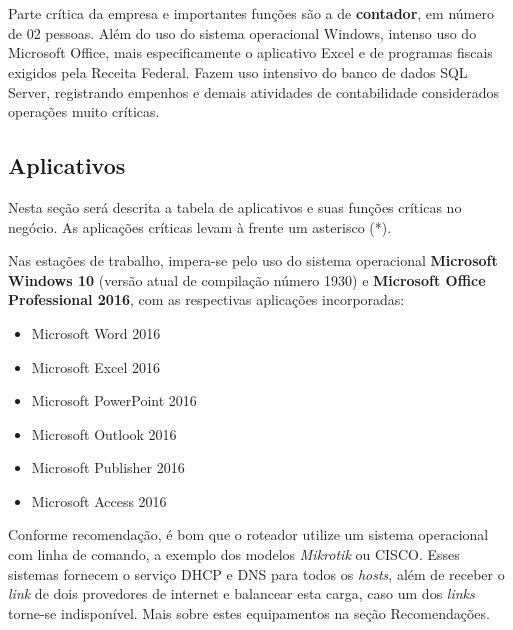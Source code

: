 \documentclass[	DIV=calc,%
							paper=a4,%
							fontsize=12pt,%
							onecolumn]{scrartcl}	 					%
\begin{document}
\\ \\
Parte crítica da empresa e importantes funções são a de \textbf{contador}, em número de 02 pessoas. Além do uso do sistema operacional Windows, intenso uso do Microsoft Office, mais especificamente o aplicativo Excel e de programas fiscais exigidos pela Receita Federal. Fazem uso intensivo do banco de dados SQL Server, registrando empenhos e demais atividades de contabilidade considerados operações muito críticas.



\subsection{Aplicativos}

Nesta seção será descrita a tabela de aplicativos e suas funções críticas no negócio. As aplicações críticas levam à frente um asterisco (*).







Nas estações de trabalho, impera-se pelo uso do sistema operacional \textbf{Microsoft Windows 10} (versão atual de compilação número 1930) e \textbf{Microsoft Office Professional 2016}, com as respectivas aplicações incorporadas: \\ 

\begin{itemize}
	\item Microsoft Word 2016 
	\item Microsoft Excel 2016
	\item Microsoft PowerPoint 2016
	\item Microsoft Outlook 2016
	\item Microsoft Publisher 2016
	\item Microsoft Access 2016
\end{itemize}



Conforme recomendação, é bom que o roteador utilize um sistema operacional com linha de comando, a exemplo dos modelos \textit{Mikrotik} ou CISCO. Esses sistemas fornecem o serviço DHCP e DNS para todos os \textit{hosts}, além de receber o \textit{link} de dois provedores de internet e balancear esta carga, caso um dos \textit{links} torne-se indisponível. Mais sobre estes equipamentos na seção {Recomendações}.
\\
\end{document}
